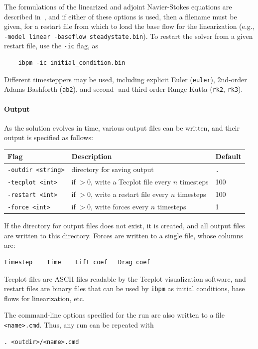 \documentclass[11pt]{article}
\begin{document}
The formulations of the linearized and adjoint Navier-Stokes equations are described in~\cite{AhuRow-08}, and if either of these options is used, then a filename must be given, for a restart file from which to load the base flow for the linearization (e.g., \verb|-model linear -baseflow steadystate.bin|).  To restart the solver from a given restart file, use the {\tt -ic} flag, as
\begin{Verbatim}
	ibpm -ic initial_condition.bin
\end{Verbatim}
Different timesteppers may be used, including explicit Euler ({\tt euler}), 2nd-order Adams-Bashforth ({\tt ab2}), and second- and third-order Runge-Kutta ({\tt rk2}, {\tt rk3}).

\paragraph{Output}
As the solution evolves in time, various output files can be written, and their output is specified as follows:

\begin{center}
\begin{tabular}{lll}
Flag & Description & Default\\
\hline
\verb|-outdir <string>| & directory for saving output & {\tt .}\\
\verb|-tecplot <int>|   & if $>0$, write a Tecplot file every $n$ timesteps & 100\\
\verb|-restart <int>|   & if $>0$, write a restart file every $n$ timesteps & 100\\
\verb|-force <int>|     & if $>0$, write forces every $n$ timesteps & 1\\
\end{tabular}
\end{center}
If the directory for output files does not exist, it is created, and all output files are written to this directory.  Forces are written to a single file, whose columns are:
\begin{Verbatim}
Timestep	Time	Lift coef	Drag coef
\end{Verbatim}
Tecplot files are ASCII files readable by the Tecplot visualization software, and restart files are binary files that can be used by {\tt ibpm} as initial conditions, base flows for linearization, etc.

The command-line options specified for the run are also written to a file \verb|<name>.cmd|.  Thus, any run can be repeated with
\begin{Verbatim}
. <outdir>/<name>.cmd
\end{Verbatim}
\end{document}
